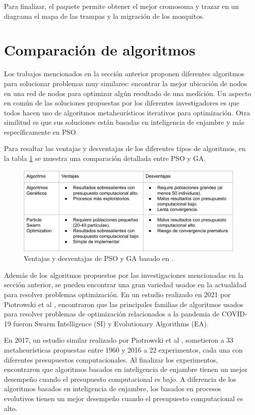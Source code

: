 \documentclass[letterpaper]{report}
\begin{document}
    Para finalizar, el paquete permite obtener el mejor cromosoma y trazar en un
    diagrama el mapa de las trampas y la migración de los mosquitos.

\section{Comparación de algoritmos}
  \label{section:analisis}
  Los trabajos mencionados en la sección anterior proponen diferentes algoritmos
  para solucionar problemas muy similares: encontrar la mejor ubicación de nodos
  en una red de nodos para optimizar algún resultado de una medición. Un aspecto
  en común de las soluciones propuestas por los diferentes investigadores es que
  todos hacen uso de algoritmos metaheurísticos iterativos para optimización.
  Otra similitud es que sus soluciones están basadas en inteligencia de enjambre
  y más específicamente en PSO. 

  Para resaltar las ventajas y desventajas de los diferentes tipos de
  algoritmos, en la tabla \ref{table:pso-ga-pros-cons} se muestra una
  comparación detallada entre PSO y GA.

  \begin{figure}[ht!]
    \includegraphics[width=\textwidth]{pso-ga-pros-cons.png}
    \caption{Ventajas y desventajas de PSO y GA basado en
      \cite{DE&PSOCov, SwarmVsEvol}.}
    \label{table:pso-ga-pros-cons}
  \end{figure}

  Además de los algoritmos propuestos por las investigaciones mencionadas en la 
  sección anterior, se pueden encontrar una gran variedad usados en la
  actualidad para 
  resolver problemas optimización. En un estudio realizado en 2021 por
  Piotrowski et al \cite{DE&PSOCov}, encontraron que las principales familias de
  algoritmos usados para resolver problemas de optimización relacionados a la 
  pandemia de COVID-19 fueron Swarm Intelligence (SI) y Evolutionary Algorithms
  (EA). 

  En 2017, un estudio similar realizado por Piotrowski et al \cite{SwarmVsEvol},
  sometieron a 33 metaheurísticas propuestas entre 1960 y 2016 a 22
  experimentos, cada una con diferentes presupuestos computacionales.
  Al finalizar los experimentos, encontraron que algoritmos basados en
  inteligencia de enjambre tienen un mejor desempeño cuando el presupuesto
  computacional es bajo. A diferencia de los algoritmos basados en inteligencia
  de enjambre, los basados en procesos evolutivos tienen un mejor desempeño
  cuando el presupuesto computacional es alto. 
  
\end{document}
